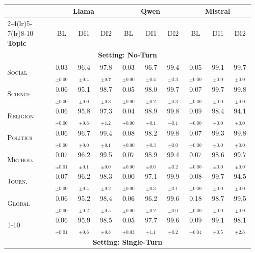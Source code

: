 \begin{table}[!t]
\centering
\footnotesize
\setlength{\tabcolsep}{3.5pt}
\renewcommand{\arraystretch}{0.98}
\begin{tabular}{l ccc ccc ccc}
\toprule
& \multicolumn{3}{c}{\textbf{Llama}} & \multicolumn{3}{c}{\textbf{Qwen}} & \multicolumn{3}{c}{\textbf{Mistral}} \\
\cmidrule(lr){2-4}\cmidrule(lr){5-7}\cmidrule(lr){8-10}
\textbf{Topic} & BL & DI1 & DI2 & BL & DI1 & DI2 & BL & DI1 & DI2 \\
\midrule
\multicolumn{10}{c}{\textbf{Setting: No-Turn}} \\
\midrule
\textsc{Social} & 0.03$_{\pm 0.00}$ & 96.4$_{\pm 0.4}$ & 97.8$_{\pm 0.7}$ & 0.03$_{\pm 0.00}$ & 96.7$_{\pm 0.4}$ & 99.4$_{\pm 0.3}$ & 0.05$_{\pm 0.00}$ & 99.1$_{\pm 0.0}$ & 99.7$_{\pm 0.0}$ \\
\textsc{Science} & 0.06$_{\pm 0.00}$ & 95.1$_{\pm 0.0}$ & 98.7$_{\pm 0.3}$ & 0.05$_{\pm 0.00}$ & 98.0$_{\pm 0.2}$ & 99.7$_{\pm 0.3}$ & 0.07$_{\pm 0.00}$ & 99.7$_{\pm 0.0}$ & 99.8$_{\pm 0.0}$ \\
\textsc{Religion} & 0.06$_{\pm 0.00}$ & 95.8$_{\pm 0.6}$ & 97.3$_{\pm 1.2}$ & 0.04$_{\pm 0.00}$ & 98.9$_{\pm 0.1}$ & 99.8$_{\pm 0.1}$ & 0.09$_{\pm 0.00}$ & 98.4$_{\pm 0.0}$ & 94.1$_{\pm 0.0}$ \\
\textsc{Politics} & 0.06$_{\pm 0.00}$ & 96.7$_{\pm 0.0}$ & 99.4$_{\pm 0.1}$ & 0.08$_{\pm 0.00}$ & 98.2$_{\pm 0.3}$ & 99.8$_{\pm 0.0}$ & 0.07$_{\pm 0.00}$ & 99.3$_{\pm 0.0}$ & 99.8$_{\pm 0.0}$ \\
\textsc{Method.} & 0.07$_{\pm 0.01}$ & 96.2$_{\pm 0.1}$ & 99.5$_{\pm 0.0}$ & 0.07$_{\pm 0.00}$ & 98.9$_{\pm 0.0}$ & 99.4$_{\pm 0.2}$ & 0.07$_{\pm 0.00}$ & 98.6$_{\pm 0.0}$ & 99.7$_{\pm 0.0}$ \\
\textsc{Journ.} & 0.07$_{\pm 0.00}$ & 96.2$_{\pm 0.4}$ & 98.3$_{\pm 0.2}$ & 0.00$_{\pm 0.00}$ & 97.1$_{\pm 0.3}$ & 99.9$_{\pm 0.1}$ & 0.08$_{\pm 0.00}$ & 99.7$_{\pm 0.0}$ & 94.5$_{\pm 0.0}$ \\
\textsc{Global} & 0.06$_{\pm 0.00}$ & 95.2$_{\pm 0.2}$ & 98.4$_{\pm 0.5}$ & 0.06$_{\pm 0.00}$ & 96.2$_{\pm 0.2}$ & 99.6$_{\pm 0.0}$ & 0.18$_{\pm 0.00}$ & 98.7$_{\pm 0.0}$ & 99.5$_{\pm 0.0}$ \\
\cmidrule{1-10}
\rowcolor{gray!10}{\textbf{Avg}.} & 0.06$_{\pm 0.01}$ & 95.9$_{\pm 0.6}$ & 98.5$_{\pm 0.8}$ & 0.05$_{\pm 0.03}$ & 97.7$_{\pm 1.1}$ & 99.6$_{\pm 0.2}$ & 0.09$_{\pm 0.04}$ & 99.1$_{\pm 0.5}$ & 98.1$_{\pm 2.6}$ \\
\midrule[\heavyrulewidth]
\multicolumn{10}{c}{\textbf{Setting: Single-Turn}} \\

\end{tabular}
\end{table}
